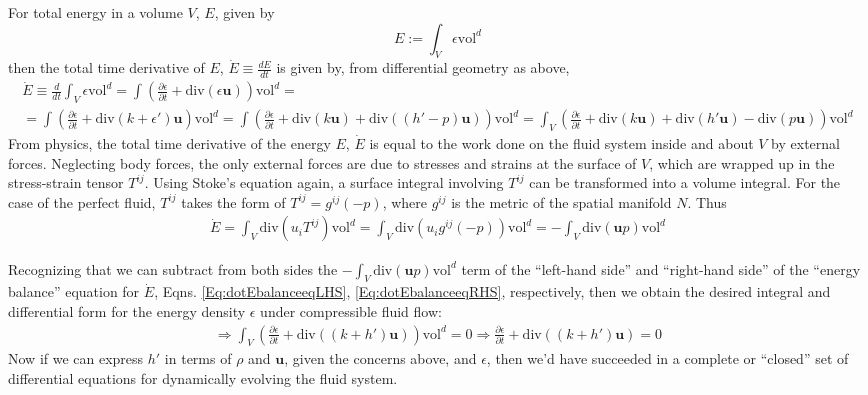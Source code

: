 \documentclass[10pt]{amsart}
\begin{document}
\begin{multicols*}{2}
For total energy in a volume $V$, $E$, given by
\begin{equation}
  E := \int_V \epsilon \text{vol}^d
  \end{equation}
then the total time derivative of $E$, $\dot{E} \equiv \frac{dE}{dt}$ is given by, from differential geometry as above,
\begin{equation}\label{Eq:dotEbalanceeqLHS}
\begin{gathered}
  \dot{E} \equiv \frac{d}{dt} \int_V \epsilon \text{vol}^d = \int \left( \frac{ \partial \epsilon }{ \partial t} + \text{div}(\epsilon \mathbf{u} ) \right) \text{vol}^d = \\
   = \int \left( \frac{ \partial \epsilon }{ \partial t} + \text{div}(k+\epsilon')\mathbf{u} \right) \text{vol}^d = \int \left( \frac{ \partial \epsilon}{ \partial t} + \text{div}(k\mathbf{u}) + \text{div}((h'-p) \mathbf{u} ) \right) \text{vol}^d = \int_V \left( \frac{ \partial \epsilon}{ \partial t} + \text{div}(k\mathbf{u}) + \text{div}(h'\mathbf{u} ) - \text{div}(p\mathbf{u}) \right) \text{vol}^d
\end{gathered}
\end{equation}
From physics, the total time derivative of the energy $E$, $\dot{E}$ is equal to the work done on the fluid system inside and about $V$ by external forces.  Neglecting body forces, the only external forces are due to stresses and strains at the surface of $V$, which are wrapped up in the stress-strain tensor $T^{ij}$.  Using Stoke's equation again, a surface integral involving $T^{ij}$ can be transformed into a volume integral.  For the case of the perfect fluid, $T^{ij}$ takes the form of $T^{ij} = g^{ij}(-p)$, where $g^{ij}$ is the metric of the spatial manifold $N$.  Thus
\begin{equation}\label{Eq:dotEbalanceeqRHS}
\begin{gathered}
  \dot{E} = \int_V \text{div}(u_iT^{ij}) \text{vol}^d = \int_V \text{div}(u_i g^{ij}(-p)) \text{vol}^d = -\int_V \text{div}(\mathbf{u}p) \text{vol}^d
  \end{gathered}
\end{equation}

Recognizing that we can subtract from both sides the $-\int_V \text{div}(\mathbf{u}p)\text{vol}^d$ term of the ``left-hand side'' and ``right-hand side'' of the ``energy balance'' equation for $\dot{E}$, Eqns. \ref{Eq:dotEbalanceeqLHS}, \ref{Eq:dotEbalanceeqRHS}, respectively, then we obtain the desired integral and differential form for the energy density $\epsilon$ under compressible fluid flow:
\begin{equation}
\begin{gathered}
  \Longrightarrow \int_V \left( \frac{ \partial \epsilon}{ \partial t} + \text{div}((k+h')\mathbf{u}) \right) \text{vol}^d =0 \Longrightarrow \boxed{ \frac{ \partial \epsilon}{ \partial t} + \text{div}((k+h')\mathbf{u}) = 0 }
  \end{gathered}
\end{equation}
Now if we can express $h'$ in terms of $\rho$ and $\mathbf{u}$, given the concerns above, and $\epsilon$, then we'd have succeeded in a complete or ``closed'' set of differential equations  for dynamically evolving the fluid system.


\end{multicols*}
\end{document}
